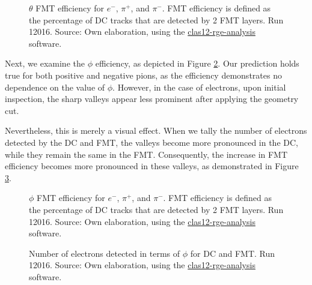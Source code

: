     \begin{figure}[t!]
        \centering{}
        \caption[$\theta$ FMT efficiency for $e^-$, $\pi^+$, and $\pi^-$.
        Run 12016]{$\theta$ FMT efficiency for $e^-$, $\pi^+$, and $\pi^-$.
        FMT efficiency is defined as the percentage of DC tracks that are detected by 2 FMT layers.
        Run 12016.
        Source: Own elaboration, using the \href{https://github.com/bleaktwig/clas12-rge-analysis}{clas12-rge-analysis} software.}
        \label{fig::14.14::fmt_efficiency_theta}
    \end{figure}

    Next, we examine the $\phi$ efficiency, as depicted in Figure \ref{fig::14.14::fmt_efficiency_phi}.
    Our prediction holds true for both positive and negative pions, as the efficiency demonstrates no dependence on the value of $\phi$.
    However, in the case of electrons, upon initial inspection, the sharp valleys appear less prominent after applying the geometry cut.

    Nevertheless, this is merely a visual effect.
    When we tally the number of electrons detected by the DC and FMT, the valleys become more pronounced in the DC, while they remain the same in the FMT.
    Consequently, the increase in FMT efficiency becomes more pronounced in these valleys, as demonstrated in Figure \ref{fig::14.14::phi_geomcut}.

    \begin{figure}[t!]
        \centering{}
        \caption[$\phi$ FMT efficiency for $e^-$, $\pi^+$, and $\pi^-$.
        Run 12016]{$\phi$ FMT efficiency for $e^-$, $\pi^+$, and $\pi^-$.
        FMT efficiency is defined as the percentage of DC tracks that are detected by 2 FMT layers.
        Run 12016.
        Source: Own elaboration, using the \href{https://github.com/bleaktwig/clas12-rge-analysis}{clas12-rge-analysis} software.}
        \label{fig::14.14::fmt_efficiency_phi}
    \end{figure}

    \begin{figure}[t!]
        \centering{}
        \caption[Number of electrons detected in terms of $\phi$ for DC and FMT efficiencies for $e^-$.
        Run 12016]{Number of electrons detected in terms of $\phi$ for DC and FMT.
        Run 12016.
        Source: Own elaboration, using the \href{https://github.com/bleaktwig/clas12-rge-analysis}{clas12-rge-analysis} software.}
        \label{fig::14.14::phi_geomcut}
    \end{figure}

